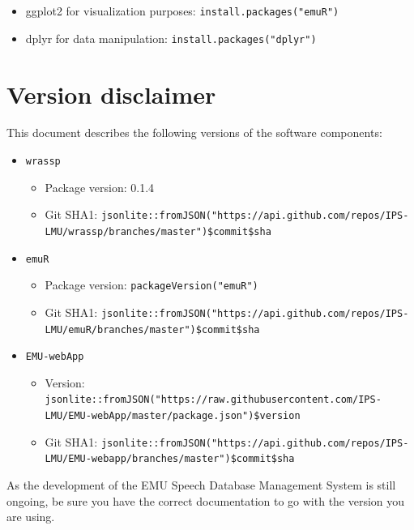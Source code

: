 \documentclass[]{book}
\providecommand{\tightlist}{%
  \setlength{\itemsep}{0pt}\setlength{\parskip}{0pt}}
\theoremstyle{definition}
\theoremstyle{definition}
\theoremstyle{definition}
\theoremstyle{remark}
\begin{document}
\begin{itemize}
\tightlist
\item
  ggplot2 for visualization purposes: \texttt{install.packages("emuR")}
\item
  dplyr for data manipulation: \texttt{install.packages("dplyr")}
\end{itemize}

\section{Version disclaimer}\label{version-disclaimer}

This document describes the following versions of the software
components:

\begin{itemize}
\tightlist
\item
  \texttt{wrassp}

  \begin{itemize}
  \tightlist
  \item
    Package version: 0.1.4
  \item
    Git SHA1:
    \texttt{jsonlite::fromJSON("https://api.github.com/repos/IPS-LMU/wrassp/branches/master")\$commit\$sha}
  \end{itemize}
\item
  \texttt{emuR}

  \begin{itemize}
  \tightlist
  \item
    Package version: \texttt{packageVersion("emuR")}
  \item
    Git SHA1:
    \texttt{jsonlite::fromJSON("https://api.github.com/repos/IPS-LMU/emuR/branches/master")\$commit\$sha}
  \end{itemize}
\item
  \texttt{EMU-webApp}

  \begin{itemize}
  \tightlist
  \item
    Version:
    \texttt{jsonlite::fromJSON("https://raw.githubusercontent.com/IPS-LMU/EMU-webApp/master/package.json")\$version}
  \item
    Git SHA1:
    \texttt{jsonlite::fromJSON("https://api.github.com/repos/IPS-LMU/EMU-webapp/branches/master")\$commit\$sha}
  \end{itemize}
\end{itemize}

As the development of the EMU Speech Database Management System is still
ongoing, be sure you have the correct documentation to go with the
version you are using.
\end{document}
